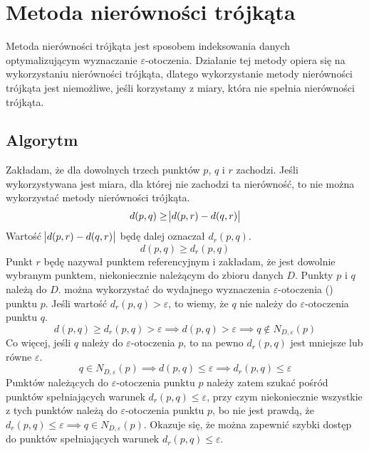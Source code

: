 \section{Metoda nierówności trójkąta}
Metoda nierówności trójkąta jest sposobem indeksowania danych optymalizującym wyznaczanie $ \varepsilon $-otoczenia. Działanie tej metody opiera się na wykorzystaniu nierówności trójkąta, dlatego wykorzystanie metody nierówności trójkąta jest niemożliwe, jeśli korzystamy z miary, która nie spełnia nierówności trójkąta.
\subsection{Algorytm}
Zakładam, że dla dowolnych trzech punktów $ p $, $ q $ i $ r $ zachodzi\linebreak {}. Jeśli wykorzystywana jest miara, dla której nie zachodzi ta nierówność, to nie można wykorzystać metody nierówności trójkąta.
\begin{equation}\label{eq:ti-raw}
	d(p,q) \ge \abs{d(p,r)-d(q,r)}
\end{equation}
Wartość $\abs{ d(p,r) - d(q,r) }$ będę dalej oznaczał $ d_r(p,q) $.
\begin{equation}\label{eq:ti}
	d(p,q) \ge d_r(p,q)
\end{equation}
 Punkt $ r $ będę nazywał punktem referencyjnym i zakładam, że jest dowolnie wybranym punktem, niekoniecznie należącym do zbioru danych $ D $. Punkty $ p $ i $ q $ należą do $ D $.  można wykorzystać do wydajnego wyznaczenia $ \varepsilon $-otoczenia () punktu $ p $. Jeśli wartość $ d_r(p,q) > \varepsilon $, to wiemy, że $ q $ nie należy do $ \varepsilon $-otoczenia punktu $ q $.
\begin{equation}
	d(p,q) \ge d_r(p,q) > \varepsilon \implies d(p,q) > \varepsilon \implies q \notin N_{D,\varepsilon}(p)
\end{equation}
Co więcej, jeśli $ q $ należy do $ \varepsilon $-otoczenia $ p $, to na pewno $ d_r(p,q) $ jest mniejsze lub równe $ \varepsilon $.
\begin{equation}
	q \in N_{D,\varepsilon}(p) \implies d(p,q) \le \varepsilon \implies d_r(p,q) \le \varepsilon
\end{equation}
Punktów należących do $ \varepsilon $-otoczenia punktu $ p $ należy zatem szukać pośród punktów spełniających warunek $ d_r(p,q) \le \varepsilon $, przy czym niekoniecznie wszystkie z tych punktów należą do $ \varepsilon $-otoczenia punktu $ p $, bo nie jest prawdą, że $ d_r(p,q) \le \varepsilon \implies q \in N_{D,\varepsilon}(p)$. Okazuje się, że można zapewnić szybki dostęp do punktów spełniających warunek $ d_r(p,q) \le \varepsilon $.
